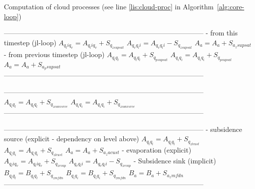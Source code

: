 \documentclass[
a4paper,     %
12pt,        %
article,
onecolumn,   %
openany,     %
]{memoir}
\begin{document}
\newpage
%
\begin{algorithm}[H]
\caption{Computation of cloud processes (see line \ref{lis:cloud-proc} 
in Algorithm~\ref{alg:core-loop})}
\label{alg:cloud-proc}
\begin{algorithmic}
\vspace{.2cm}
\Indent
\vspace{-.2cm}
\State ---------------------------------------------------------------------------------------
\vspace{-.2cm}
\State - from this timestep (jl-loop)
\State $A_{q_li q_v} = A_{q_li q_v} + S_{q_{zsupsat}}$
\State $A_{q_v q_li} = A_{q_v q_li} - S_{q_{zsupsat}}$
\State $A_a = A_a + S_{a_zsupsat}$
\State - from previous timestep (jl-loop)
\State $A_{q_l q_l} = A_{q_l q_l} + S_{q_{psupsat}}$
\State $A_{q_i q_i} = A_{q_i q_i} + S_{q_{psupsat}}$
\State $A_a = A_a + S_{a_psupsat}$
\vspace{-.2cm}
\State ---------------------------------------------------------------------------------------
\vspace{.4cm}
\EndIndent

\Indent
\vspace{-.2cm}
\State ---------------------------------------------------------------------------------------
\vspace{-.2cm}
\State $A_{q_l q_l} = A_{q_l q_l} + S_{q_{zconvsrce}}$
\State $A_{q_i q_i} = A_{q_i q_i} + S_{q_{zconvsrce}}$
\vspace{-.2cm}
\State ---------------------------------------------------------------------------------------
\vspace{.4cm}
\EndIndent

\Indent
\vspace{-.2cm}
\State ---------------------------------------------------------------------------------------
\vspace{-.2cm}
\State - subsidence source (explicit - dependency on level above)
\State $A_{q_l q_l} = A_{q_l q_l} + S_{q_{zlcust}}$
\State $A_{q_i q_i} = A_{q_i q_i} + S_{q_{zlcust}}$
\State $A_a = A_a + S_{a_zacust}$
\State - evaporation (explicit)    
\State $A_{q_li q_v} = A_{q_li q_v} + S_{q_{zevap}}$
\State $A_{q_v q_li} = A_{q_v q_li} - S_{q_{zevap}}$
\State - Subsidence sink (implicit)
\State $B_{q_l q_l} = B_{q_l q_l} + S_{q_{zmfdn}}$
\State $B_{q_i q_i} = B_{q_i q_i} + S_{q_{zmfdn}}$
\State $B_a = B_a + S_{a_zmfdn}$
\vspace{-.2cm}
\State ---------------------------------------------------------------------------------------
\vspace{.4cm}
\EndIndent


\end{algorithmic}
\end{algorithm}
\end{document}
